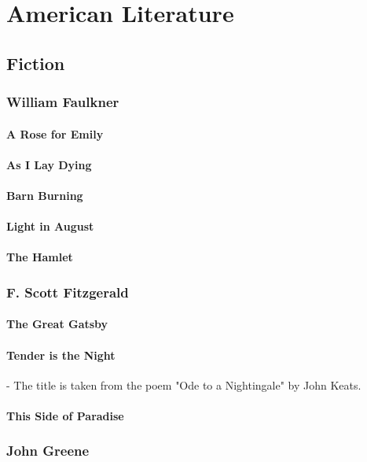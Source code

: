 	\section{American Literature}
		\subsection{Fiction}
		\subsubsection{William Faulkner}
			\paragraph{A Rose for Emily}
			\paragraph{As I Lay Dying}
			\paragraph{Barn Burning}
			\paragraph{Light in August}
			\paragraph{The Hamlet}
			
		\subsubsection{F. Scott Fitzgerald}
			\paragraph{The Great Gatsby}
			 \paragraph{Tender is the Night} - The title is taken from the poem "Ode to a Nightingale" by John Keats. 
			 \paragraph{This Side of Paradise}
			 
			
			\subsubsection{John Greene}
